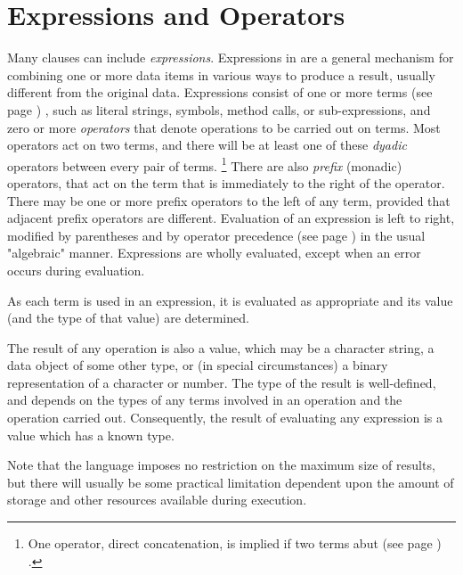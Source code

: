 \chapter{Expressions and Operators}\label{refexpr}
 Many clauses can include \emph{expressions}.  Expressions in \nr{}
are a general mechanism for combining one or more data items in various
ways to produce a result, usually different from the original data.
 Expressions consist of one or more  terms (see page \pageref{refterms}) , such as
literal strings, symbols, method calls, or sub-expressions,
and zero or more \emph{operators} that denote operations to be carried
out on terms.
Most operators act on two terms, and there will be at least one of these
\emph{dyadic} operators between every pair of terms.
\footnote{
One operator, direct concatenation, is implied if two terms
 abut (see page \pageref{refabut}) .
}
There are also \emph{prefix} (monadic) operators, that act on the
term that is immediately to the right of the operator.
There may be one or more prefix operators to the left of any term,
provided that adjacent prefix operators are different.
Evaluation of an expression is left to right, modified by parentheses
and by  operator precedence (see page \pageref{refpreced})  in the usual
"algebraic" manner.
Expressions are wholly evaluated, except when an error occurs during
evaluation.

As each term is used in an expression, it is evaluated as
appropriate and its value (and the type of that value) are determined.
 
The result of any operation is also a value, which may be a character
string, a data object of some other type, or (in special circumstances)
a binary representation of a character or number.  The type of the
result is well-defined, and depends on the types of any terms involved
in an operation and the operation carried out.
Consequently, the result of evaluating any expression is a value which
has a known type.
 
Note that the \nr{} language imposes no restriction on the maximum
size of results, but there will usually be some practical limitation
dependent upon the amount of storage and other resources available
during execution.
